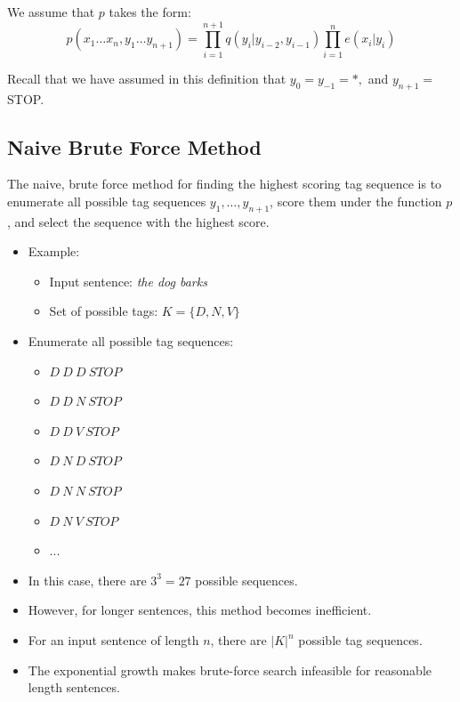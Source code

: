   We assume that $p$ takes the form:
  \[
    p(x_1 \ldots x_n, y_1 \ldots y_{n+1}) = \prod_{i=1}^{n+1} q(y_i|y_{i-2}, y_{i-1}) \prod_{i=1}^{n} e(x_i|y_i)
  \]
  
  
  Recall that we have assumed in this definition that $y_0 = y_{-1} = *,$ and $y_{n+1} =$ STOP.
  

\subsection{Naive Brute Force Method}

The naive, brute force method for finding the highest scoring tag sequence is to enumerate all possible tag sequences $y_1, \ldots, y_{n+1}$, score them under the function $p$, and select the sequence with the highest score.

\begin{itemize}
    \item Example:
    \begin{itemize}
        \item Input sentence: \textit{the dog barks}
        \item Set of possible tags: $K = \{D, N, V\}$
    \end{itemize}
    
    \item Enumerate all possible tag sequences:
    \begin{itemize}
        \item $D\ D\ D\ STOP$
        \item $D\ D\ N\ STOP$
        \item $D\ D\ V\ STOP$
        \item $D\ N\ D\ STOP$
        \item $D\ N\ N\ STOP$
        \item $D\ N\ V\ STOP$
        \item ...
    \end{itemize}
   
   
    \item In this case, there are $3^3 = 27$ possible sequences.
    
    \item However, for longer sentences, this method becomes inefficient.
    
    \item For an input sentence of length $n$, there are $|K|^n$ possible tag sequences.
    
    \item The exponential growth makes brute-force search infeasible for reasonable length sentences.
\end{itemize}


